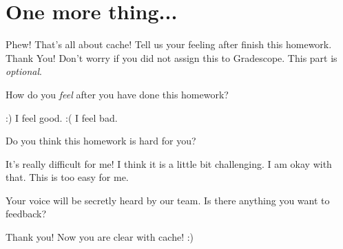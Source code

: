 \section*{One more thing...}
Phew! That's all about cache! Tell us your feeling after finish this
homework. Thank You! Don't worry if you did not assign this to
Gradescope. This part is \emph{optional}.

\begin{questions}

\question[0] How do you \emph{feel} after you have done this homework?

{
    \begin{solution}
        \begin{checkboxes}
            \choice :) I feel good.
            \choice :( I feel bad.
        \end{checkboxes}
    \end{solution}
}

\question[0] Do you think this homework is hard for you?

{
    \begin{solution}
        \begin{checkboxes}
            \choice It's really difficult for me!
            \choice I think it is a little bit challenging.
            \choice I am okay with that.
            \choice This is too easy for me.
        \end{checkboxes}
    \end{solution}
}

\question[0] Your voice will be secretly heard by our team.
Is there anything you want to feedback?

{
    \begin{solution}
        \vspace{1in}
    \end{solution}
}

\vspace*{\fill}
\begin{center}
\Large Thank you! Now you are clear with cache! :)
\end{center}

\end{questions}